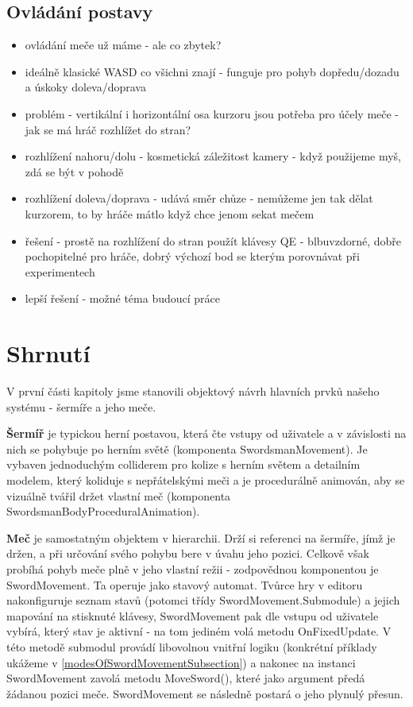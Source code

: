 \subsection{Ovládání postavy}
\begin{itemize}
    \item ovládání meče už máme - ale co zbytek?
    \item ideálně klasické WASD co všichni znají - funguje pro pohyb dopředu/dozadu a úskoky doleva/doprava
    \item problém - vertikální i horizontální osa kurzoru jsou potřeba pro účely meče - jak se má hráč rozhlížet do stran?
    \item rozhlížení nahoru/dolu - kosmetická záležitost kamery - když použijeme myš, zdá se být v pohodě
    \item rozhlížení doleva/doprava - udává směr chůze - nemůžeme jen tak dělat kurzorem, to by hráče mátlo když chce jenom sekat mečem 
    \item řešení - prostě na rozhlížení do stran použít klávesy QE - blbuvzdorné, dobře pochopitelné pro hráče, dobrý výchozí bod se kterým porovnávat při experimentech
    \item lepší řešení - možné téma budoucí práce
\end{itemize}


\section{Shrnutí}

V první části kapitoly jsme stanovili objektový návrh hlavních prvků našeho systému - šermíře a jeho meče. 

\textbf{Šermíř} je typickou herní postavou, která čte vstupy od uživatele a v závislosti na nich se pohybuje po herním světě (komponenta SwordsmanMovement). Je vybaven jednoduchým colliderem pro kolize s herním světem a detailním modelem, který koliduje s nepřátelskými meči a je procedurálně animován, aby se vizuálně tvářil držet vlastní meč (komponenta SwordsmanBodyProceduralAnimation). 

\textbf{Meč} je samostatným objektem v hierarchii. Drží si referenci na šermíře, jímž je držen, a při určování svého pohybu bere v úvahu jeho pozici. Celkově však probíhá pohyb meče plně v jeho vlastní režii - zodpovědnou komponentou je SwordMovement. Ta operuje jako stavový automat. Tvůrce hry v editoru nakonfiguruje seznam stavů (potomci třídy SwordMovement.Submodule) a jejich mapování na stisknuté klávesy, SwordMovement pak dle vstupu od uživatele vybírá, který stav je aktivní - na tom jediném volá metodu OnFixedUpdate. V této metodě submodul provádí libovolnou vnitřní logiku (konkrétní příklady ukážeme v \ref{modesOfSwordMovementSubsection}) a nakonec na instanci SwordMovement zavolá metodu MoveSword(), které jako argument předá žádanou pozici meče. SwordMovement se následně postará o jeho plynulý přesun. 

